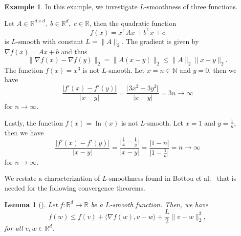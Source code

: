 \documentclass[12pt]{article}
\newtheorem{lemma}[lemma]{Lemma}
\theoremstyle{definition}
\newtheorem{example}[example]{Example}
\numberwithin{equation}{section}
\newcommand{\N}{\mathbb{N}}
\newcommand{\R}{\mathbb{R}}
\newcommand{\T}{\mathsf{T}}
\newcommand{\norm}[1]{\lVert{#1}\rVert_2}
\begin{document}
\begin{example}
  In this example, we investigate $L$-smoothness of three functions. 

  Let $A \in \R^{d \times d},\; b \in \R^d,\; c \in \R$, then the quadratic function
  \begin{equation*}
    f(x) = x^\T A x + b^\T x + c
  \end{equation*}
  is $L$-smooth with constant $L = \norm{A}$. The gradient is given by $\nabla f(x)  = Ax + b$ and thus
  \begin{equation*}
    \norm{\nabla f(x) - \nabla f(y)} = \norm{A(x-y)} \leq \norm{A} \norm{x-y}.
  \end{equation*}
  The function $f(x) = x^3$ is not $L$-smooth. Let $x = n \in \N$ and $y = 0$, then we have
  \begin{equation*}
    \frac{\lvert f'(x) - f'(y) \rvert}{\lvert x - y \rvert} = \frac{\lvert3x^2 - 3 y^2 \rvert}{\lvert x-y \rvert} = 3n \rightarrow \infty
  \end{equation*}
  for $n \rightarrow \infty$.

  Lastly, the function $f(x) = \ln(x)$ is not $L$-smooth. Let $x = 1$ and $y = \frac{1}{n}$, then we have
  \begin{equation*}
    \frac{\lvert f'(x) - f'(y) \rvert}{\lvert x - y \rvert} = \frac{\lvert \frac{1}{x}- \frac{1}{y} \rvert}{\lvert x-y \rvert} = \frac{\lvert 1- n\rvert}{\lvert 1-\frac{1}{n} \rvert} = n \rightarrow \infty
  \end{equation*}
  for $n \rightarrow \infty$. 
\end{example}
We restate a characterization of $L$-smoothness found in Bottou et al.\ \cite{bottouOptimizationMethodsLargeScale2018} that is needed for the following convergence theorems.
\begin{lemma}[]
  Let $f : \R^d \rightarrow \R$ be a $L$-smooth function. Then, we have 
  \begin{equation}
    f(w) \leq f(v) + \langle \nabla f(w), v - w \rangle + \frac{L}{2} \norm{ v - w }^2,
  \end{equation}
  for all $v, w \in \R^d$.
\end{lemma}
\end{document}

